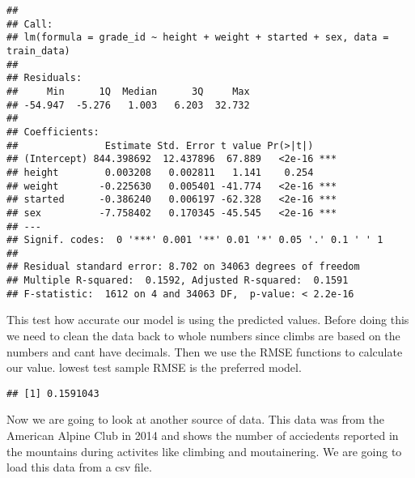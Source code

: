 \documentclass[]{article}
\newenvironment{Shaded}{\begin{snugshade}}{\end{snugshade}}
\newcommand{\KeywordTok}[1]{\textcolor[rgb]{0.13,0.29,0.53}{\textbf{#1}}}
\newcommand{\NormalTok}[1]{#1}
\newcommand{\OperatorTok}[1]{\textcolor[rgb]{0.81,0.36,0.00}{\textbf{#1}}}
\newcommand{\StringTok}[1]{\textcolor[rgb]{0.31,0.60,0.02}{#1}}
\begin{document}
\begin{verbatim}
## 
## Call:
## lm(formula = grade_id ~ height + weight + started + sex, data = train_data)
## 
## Residuals:
##     Min      1Q  Median      3Q     Max 
## -54.947  -5.276   1.003   6.203  32.732 
## 
## Coefficients:
##               Estimate Std. Error t value Pr(>|t|)    
## (Intercept) 844.398692  12.437896  67.889   <2e-16 ***
## height        0.003208   0.002811   1.141    0.254    
## weight       -0.225630   0.005401 -41.774   <2e-16 ***
## started      -0.386240   0.006197 -62.328   <2e-16 ***
## sex          -7.758402   0.170345 -45.545   <2e-16 ***
## ---
## Signif. codes:  0 '***' 0.001 '**' 0.01 '*' 0.05 '.' 0.1 ' ' 1
## 
## Residual standard error: 8.702 on 34063 degrees of freedom
## Multiple R-squared:  0.1592, Adjusted R-squared:  0.1591 
## F-statistic:  1612 on 4 and 34063 DF,  p-value: < 2.2e-16
\end{verbatim}

This test how accurate our model is using the predicted values. Before
doing this we need to clean the data back to whole numbers since climbs
are based on the numbers and cant have decimals. Then we use the RMSE
functions to calculate our value. lowest test sample RMSE is the
preferred model.

\begin{Shaded}
\end{Shaded}

\begin{verbatim}
## [1] 0.1591043
\end{verbatim}

Now we are going to look at another source of data. This data was from
the American Alpine Club in 2014 and shows the number of acciedents
reported in the mountains during activites like climbing and
moutainering. We are going to load this data from a csv file.
\end{document}
